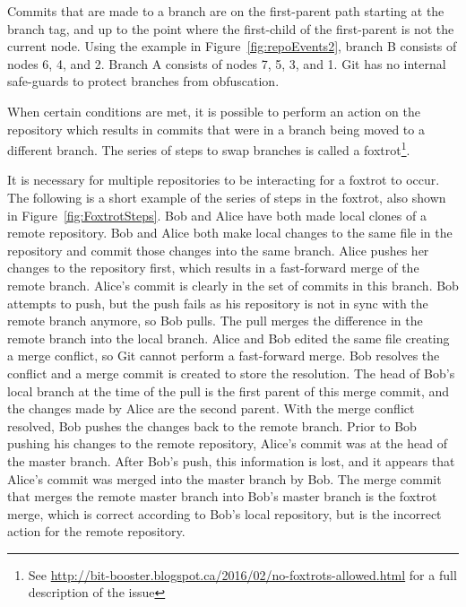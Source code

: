 Commits that are made to a branch are on the first-parent path starting
at the branch tag, and up to the point where the first-child of the
first-parent is not the current node.
Using the example in Figure~\ref{fig:repoEvents2}, branch B consists of
nodes 6, 4, and 2. Branch A consists of nodes 7, 5, 3, and 1.
Git has no internal safe-guards to protect branches from obfuscation.

When certain conditions are met, it is possible to perform an action on
the repository which results in commits that were in a branch being
moved to a different branch.
The series of steps to swap branches is called a foxtrot\footnote{See
  \url{http://bit-booster.blogspot.ca/2016/02/no-foxtrots-allowed.html}
  for a full description of the issue}.

It is necessary for multiple repositories to be interacting for a
foxtrot to occur.
The following is a short example of the series of steps in the foxtrot,
also shown in Figure~\ref{fig:FoxtrotSteps}.
Bob and Alice have both made local clones of a remote
repository.
Bob and Alice both make local changes to the same file in the
repository and commit those changes into the same branch.
Alice pushes her changes to the repository first, which results in a
fast-forward merge of the remote branch.
Alice's commit is clearly in the set of commits in this branch.
Bob attempts to push, but the push fails as his repository is not in
sync with the remote branch anymore, so Bob pulls.
The pull merges the difference in the remote branch into the local
branch.
Alice and Bob edited the same file creating a merge conflict, so Git
cannot perform a fast-forward merge.
Bob resolves the conflict and a merge commit is created to store the
resolution.
The head of Bob's local branch at the time of the pull is the first
parent of this merge commit, and the changes made by Alice are the
second parent.
With the merge conflict resolved, Bob pushes the changes back to the
remote branch.
Prior to Bob pushing his changes to the remote repository, Alice's
commit was at the head of the master branch.
After Bob's push, this information is lost, and it appears that Alice's
commit was merged into the master branch by Bob.
The merge commit that merges the remote master branch into Bob's master
branch is the foxtrot merge, which is correct according to Bob's local
repository, but is the incorrect action for the remote repository.

